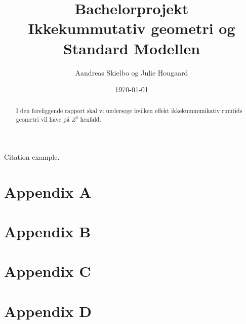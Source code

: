 \documentclass[11pt,a4paper,titlepage]{article}
\numberwithin{equation}{section}
\begin{document}
\title{Bachelorprojekt\\Ikkekummutativ geometri og Standard Modellen}
\author{Aandreas Skielbo og Julie Hougaard}
\date{\today}
\maketitle
{}

\begin{abstract}
I den foreliggende rapport skal vi undersøge hvilken effekt ikkekummunikativ rumtids geometri vil have på $Z^0$ henfald.
\end{abstract}

\clearpage
\tableofcontents
\clearpage



Citation example.\cite{melic2005smn}










\clearpage




\clearpage



\section{Appendix A}

\clearpage

\section{Appendix B}


\clearpage

\section{Appendix C}

\clearpage

\section{Appendix D}

\end{document}
